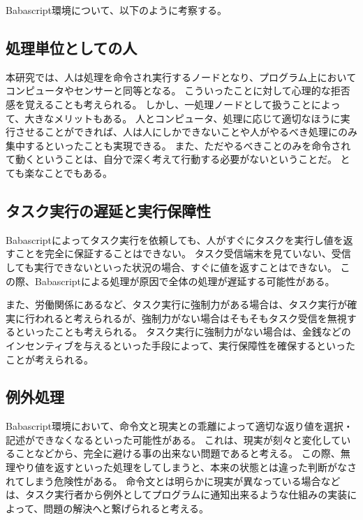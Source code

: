 Babascript環境について、以下のように考察する。

\subsection{処理単位としての人}\label{ux51e6ux7406ux5358ux4f4dux3068ux3057ux3066ux306eux4eba}

本研究では、人は処理を命令され実行するノードとなり、プログラム上においてコンピュータやセンサーと同等となる。
こういったことに対して心理的な拒否感を覚えることも考えられる。
しかし、一処理ノードとして扱うことによって、大きなメリットもある。
人とコンピュータ、処理に応じて適切なほうに実行させることができれば、人は人にしかできないことや人がやるべき処理にのみ集中するといったことも実現できる。
また、ただやるべきことのみを命令されて動くということは、自分で深く考えて行動する必要がないということだ。
とても楽なことでもある。

\subsection{タスク実行の遅延と実行保障性}\label{ux30bfux30b9ux30afux5b9fux884cux306eux9045ux5ef6ux3068ux5b9fux884cux4fddux969cux6027}

Babascriptによってタスク実行を依頼しても、人がすぐにタスクを実行し値を返すことを完全に保証することはできない。
タスク受信端末を見ていない、受信しても実行できないといった状況の場合、すぐに値を返すことはできない。
この際、Babascriptによる処理が原因で全体の処理が遅延する可能性がある。

また、労働関係にあるなど、タスク実行に強制力がある場合は、タスク実行が確実に行われると考えられるが、強制力がない場合はそもそもタスク受信を無視するといったことも考えられる。
タスク実行に強制力がない場合は、金銭などのインセンティブを与えるといった手段によって、実行保障性を確保するといったことが考えられる。

\subsection{例外処理}\label{ux4f8bux5916ux51e6ux7406}

Babascript環境において、命令文と現実との乖離によって適切な返り値を選択・記述ができなくなるといった可能性がある。
これは、現実が刻々と変化していることなどから、完全に避ける事の出来ない問題であると考える。
この際、無理やり値を返すといった処理をしてしまうと、本来の状態とは違った判断がなされてしまう危険性がある。
命令文とは明らかに現実が異なっている場合などは、タスク実行者から例外としてプログラムに通知出来るような仕組みの実装によって、問題の解決へと繋げられると考える。


